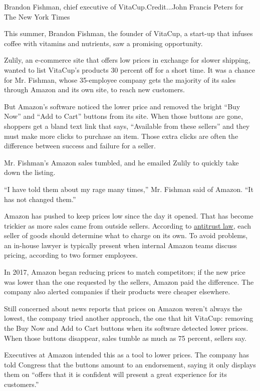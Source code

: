 Brandon Fishman, chief executive of VitaCup.Credit...John Francis Peters
for The New York Times

This summer, Brandon Fishman, the founder of VitaCup, a start-up that
infuses coffee with vitamins and nutrients, saw a promising opportunity.

Zulily, an e-commerce site that offers low prices in exchange for slower
shipping, wanted to list VitaCup's products 30 percent off for a short
time. It was a chance for Mr. Fishman, whose 35-employee company gets
the majority of its sales through Amazon and its own site, to reach new
customers.

But Amazon's software noticed the lower price and removed the bright
``Buy Now'' and ``Add to Cart'' buttons from its site. When those
buttons are gone, shoppers get a bland text link that says, ``Available
from these sellers'' and they must make more clicks to purchase an item.
Those extra clicks are often the difference between success and failure
for a seller.

Mr. Fishman's Amazon sales tumbled, and he emailed Zulily to quickly
take down the listing.

``I have told them about my rage many times,'' Mr. Fishman said of
Amazon. ``It has not changed them.''

Amazon has pushed to keep prices low since the day it opened. That has
become trickier as more sales came from outside sellers. According to
\href{https://www.ftc.gov/tips-advice/competition-guidance/guide-antitrust-laws/dealings-competitors/price-fixing}{antitrust
law}, each seller of goods should determine what to charge on its own.
To avoid problems, an in-house lawyer is typically present when internal
Amazon teams discuss pricing, according to two former employees.

In 2017, Amazon began reducing prices to match competitors; if the new
price was lower than the one requested by the sellers, Amazon paid the
difference. The company also alerted companies if their products were
cheaper elsewhere.

Still concerned about news reports that prices on Amazon weren't always
the lowest, the company tried another approach, the one that hit
VitaCup: removing the Buy Now and Add to Cart buttons when its software
detected lower prices. When those buttons disappear, sales tumble as
much as 75 percent, sellers say.

Executives at Amazon intended this as a tool to lower prices. The
company has told Congress that the buttons amount to an endorsement,
saying it only displays them on ``offers that it is confident will
present a great experience for its customers.''

